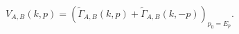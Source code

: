 \begin{equation}
\label{eq:def_vab}
  V_{A,B}(k,p) =\left(\tilde{\Gamma}_{A,B}(k,p)
      +\tilde{\Gamma}_{A,B}(k,-p)\right)_{p_0=E_p}.
\end{equation}

